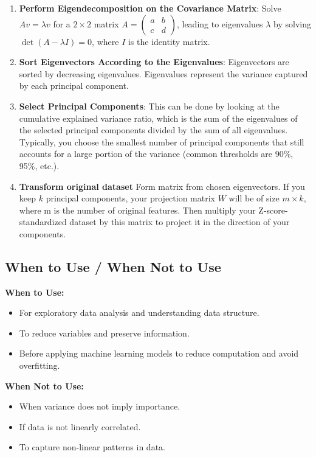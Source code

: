 \documentclass[12pt]{article}
\begin{document}
\begin{enumerate}
    \item \textbf{Perform Eigendecomposition on the Covariance Matrix}: Solve \(Av = \lambda v\) for a \(2 \times 2\) matrix \(A = \begin{pmatrix} a & b \\ c & d \end{pmatrix}\), leading to eigenvalues \(\lambda\) by solving \(\det(A - \lambda I) = 0\), where \(I\) is the identity matrix.
    \item \textbf{Sort Eigenvectors According to the Eigenvalues}: Eigenvectors are sorted by decreasing eigenvalues. Eigenvalues represent the variance captured by each principal component.
    \item \textbf{Select Principal Components}: This can be done by looking at the cumulative explained variance ratio, which is the sum of the eigenvalues of the selected principal components divided by the sum of all eigenvalues. Typically, you choose the smallest number of principal components that still accounts for a large portion of the variance (common thresholds are 90\%, 95\%, etc.).
	\item \textbf{Transform original dataset} Form matrix from chosen eigenvectors. If you keep \(k\) principal components, your projection matrix \(W\) will be of size \(m \times k\), where m is the number of original features. Then multiply your Z-score-standardized dataset by this matrix to project it in the direction of your components.
\end{enumerate} 

\subsection{When to Use / When Not to Use}
\textbf{When to Use:}
\begin{itemize}
    \item For exploratory data analysis and understanding data structure.
    \item To reduce variables and preserve information.
    \item Before applying machine learning models to reduce computation and avoid overfitting.
\end{itemize}

\textbf{When Not to Use:}
\begin{itemize}
    \item When variance does not imply importance.
    \item If data is not linearly correlated.
    \item To capture non-linear patterns in data.
\end{itemize}
\end{document}
